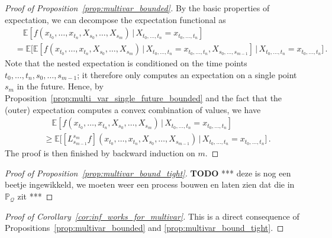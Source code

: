 \documentclass[10pt]{paper}
\theoremstyle{definition}
\newcommand{\processes}{\mathbb{P}}
\newcommand{\rateset}{\mathcal{Q}}
\begin{document}
\begin{proof}[Proof of Proposition~\ref{prop:multivar_bounded}]
By the basic properties of expectation, we can decompose the expectation functional as
\begin{align*}
 &\quad \mathbb{E}[f(x_{t_0},\ldots,x_{t_n},X_{s_0},\ldots,X_{s_m})\,\vert\,X_{t_0,\ldots,t_n}=x_{t_0,\ldots,t_n}] \\
 &= \mathbb{E}\bigl[\mathbb{E}[f(x_{t_0},\ldots,x_{t_n},X_{s_0},\ldots,X_{s_m})\,\vert\,X_{t_0,\ldots,t_n}=x_{t_0,\ldots,t_n},X_{s_0,\ldots,s_{m-1}}]\,\big\vert\,X_{t_0,\ldots,t_n}=x_{t_0,\ldots,t_n}\bigr]\,.
\end{align*}
Note that the nested expectation is conditioned on the time points $t_0,\ldots,t_n,s_0,\ldots,s_{m-1}$; it therefore only computes an expectation on a single point $s_m$ in the future. Hence, by Proposition~\ref{prop:multi_var_single_future_bounded} and the fact that the (outer) expectation computes a convex combination of values, we have
\begin{align*}
&\quad\mathbb{E}[f(x_{t_0},\ldots,x_{t_n},X_{s_0},\ldots,X_{s_m})\,\vert\,X_{t_0,\ldots,t_n}=x_{t_0,\ldots,t_n}] \\
 &\geq \mathbb{E}\bigl[[L_{s_{m-1}}^{s_m}f](x_{t_0},\ldots,x_{t_n},X_{s_0},\ldots,X_{s_{m-1}})\,\vert\,X_{t_0,\ldots,t_n}=x_{t_0,\ldots,t_n}\bigr]\,.
\end{align*}
The proof is then finished by backward induction on $m$.
\end{proof}

\begin{proof}[Proof of Proposition~\ref{prop:multivar_bound_tight}]
{\bf TODO} *** deze is nog een beetje ingewikkeld, we moeten weer een process bouwen en laten zien dat die in $\processes_\rateset$ zit ***
\end{proof}

\begin{proof}[Proof of Corollary~\ref{cor:inf_works_for_multivar}]
This is a direct consequence of Propositions~\ref{prop:multivar_bounded} and \ref{prop:multivar_bound_tight}.
\end{proof}
\end{document}
